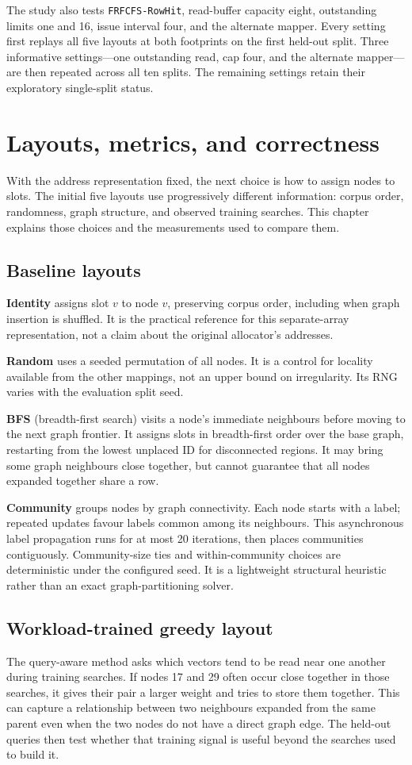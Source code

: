 \documentclass[11pt,a4paper]{report}
\newcommand{\QA}{query-aware}
\begin{document}
The study also tests \texttt{FRFCFS-RowHit}, read-buffer capacity eight, outstanding limits one and 16, issue interval four, and the alternate mapper. Every setting first replays all five layouts at both footprints on the first held-out split. Three informative settings---one outstanding read, cap four, and the alternate mapper---are then repeated across all ten splits. The remaining settings retain their exploratory single-split status.

\chapter{Layouts, metrics, and correctness}
With the address representation fixed, the next choice is how to assign nodes to slots. The initial five layouts use progressively different information: corpus order, randomness, graph structure, and observed training searches. This chapter explains those choices and the measurements used to compare them.
\section{Baseline layouts}
\textbf{Identity} assigns slot $v$ to node $v$, preserving corpus order, including when graph insertion is shuffled. It is the practical reference for this separate-array representation, not a claim about the original allocator's addresses.

\textbf{Random} uses a seeded permutation of all nodes. It is a control for locality available from the other mappings, not an upper bound on irregularity. Its RNG varies with the evaluation split seed.

\textbf{BFS} (breadth-first search) visits a node's immediate neighbours before moving to the next graph frontier. It assigns slots in breadth-first order over the base graph, restarting from the lowest unplaced ID for disconnected regions. It may bring some graph neighbours close together, but cannot guarantee that all nodes expanded together share a row.

\textbf{Community} groups nodes by graph connectivity. Each node starts with a label; repeated updates favour labels common among its neighbours. This asynchronous label propagation runs for at most 20 iterations, then places communities contiguously. Community-size ties and within-community choices are deterministic under the configured seed. It is a lightweight structural heuristic rather than an exact graph-partitioning solver.

\section{Workload-trained greedy layout}
The \QA{} method asks which vectors tend to be read near one another during training searches. If nodes 17 and 29 often occur close together in those searches, it gives their pair a larger weight and tries to store them together. This can capture a relationship between two neighbours expanded from the same parent even when the two nodes do not have a direct graph edge. The held-out queries then test whether that training signal is useful beyond the searches used to build it.
\end{document}
